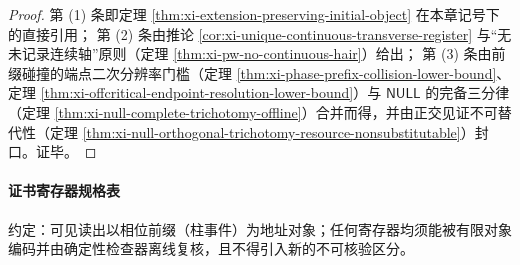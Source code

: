 \begin{proof}
第 (1) 条即定理 \ref{thm:xi-extension-preserving-initial-object} 在本章记号下的直接引用；
第 (2) 条由推论 \ref{cor:xi-unique-continuous-transverse-register} 与“无未记录连续轴”原则（定理 \ref{thm:xi-pw-no-continuous-hair}）给出；
第 (3) 条由前缀碰撞的端点二次分辨率门槛（定理 \ref{thm:xi-phase-prefix-collision-lower-bound}、定理 \ref{thm:xi-offcritical-endpoint-resolution-lower-bound}）与 \(\mathsf{NULL}\) 的完备三分律（定理 \ref{thm:xi-null-complete-trichotomy-offline}）合并而得，并由正交见证不可替代性（定理 \ref{thm:xi-null-orthogonal-trichotomy-resource-nonsubstitutable}）封口。证毕。
\end{proof}


\paragraph{证书寄存器规格表}
约定：可见读出以相位前缀（柱事件）为地址对象；任何寄存器均须能被有限对象编码并由确定性检查器离线复核，且不得引入新的不可核验区分。

